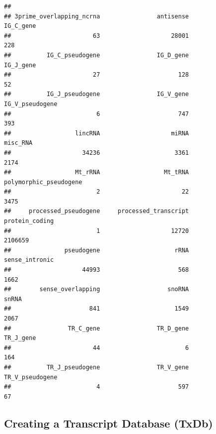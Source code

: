 \documentclass[
]{book}
\newenvironment{Shaded}{\begin{snugshade}}{\end{snugshade}}
\newcommand{\CommentTok}[1]{\textcolor[rgb]{0.56,0.35,0.01}{\textit{#1}}}
\newcommand{\FunctionTok}[1]{\textcolor[rgb]{0.13,0.29,0.53}{\textbf{#1}}}
\newcommand{\NormalTok}[1]{#1}
\newcommand{\OtherTok}[1]{\textcolor[rgb]{0.56,0.35,0.01}{#1}}
\newcommand{\SpecialCharTok}[1]{\textcolor[rgb]{0.81,0.36,0.00}{\textbf{#1}}}
\newcommand{\StringTok}[1]{\textcolor[rgb]{0.31,0.60,0.02}{#1}}
\begin{document}
\begin{verbatim}
## 
## 3prime_overlapping_ncrna                antisense                IG_C_gene 
##                       63                    28001                      228 
##          IG_C_pseudogene                IG_D_gene                IG_J_gene 
##                       27                      128                       52 
##          IG_J_pseudogene                IG_V_gene          IG_V_pseudogene 
##                        6                      747                      393 
##                  lincRNA                    miRNA                 misc_RNA 
##                    34236                     3361                     2174 
##                  Mt_rRNA                  Mt_tRNA   polymorphic_pseudogene 
##                        2                       22                     3475 
##     processed_pseudogene     processed_transcript           protein_coding 
##                        1                    12720                  2106659 
##               pseudogene                     rRNA           sense_intronic 
##                    44993                      568                     1662 
##        sense_overlapping                   snoRNA                    snRNA 
##                      841                     1549                     2067 
##                TR_C_gene                TR_D_gene                TR_J_gene 
##                       44                        6                      164 
##          TR_J_pseudogene                TR_V_gene          TR_V_pseudogene 
##                        4                      597                       67
\end{verbatim}

\begin{Shaded}
\end{Shaded}

\hypertarget{creating-a-transcript-database-txdb}{%
\subsection{Creating a Transcript Database (TxDb)}\label{creating-a-transcript-database-txdb}}
\end{document}
